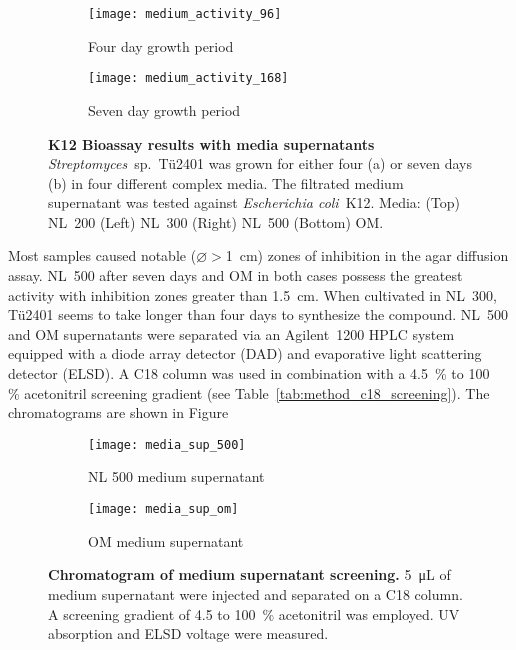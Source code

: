 \begin{figure}[htbp]
	\centering
	\begin{subfigure}{0.4\textwidth}
		\texttt{[image: medium\_activity\_96]}
		\caption{Four day growth period}
	\end{subfigure}%
	\begin{subfigure}{0.4\textwidth}
		\texttt{[image: medium\_activity\_168]}
		\caption{Seven day growth period}
	\end{subfigure}
	\caption[K12 Bioassay results with media supernatants]{%
		\textbf{K12 Bioassay results with media supernatants} \textit{Streptomyces}~sp.~Tü2401 was grown for either four (a)
    or seven days (b) in four different complex media. The filtrated medium supernatant was tested against
    \textit{Escherichia coli}~K12. Media: (Top) NL~200 (Left) NL~300 (Right) NL~500 (Bottom) OM.}
	\label{fig:medium_activity}
\end{figure}

Most samples caused notable ($\varnothing>$\SI{1}{\centi\meter}) zones of inhibition in the agar diffusion assay.
NL~500 after seven days and OM in both cases possess the greatest activity with inhibition zones greater than \SI{1.5}{\centi\meter}.
When cultivated in NL~300, Tü2401 seems to take longer than four days to synthesize the
compound.
NL~500 and OM supernatants were separated via an Agilent~1200 HPLC system equipped with a diode array detector (DAD) and evaporative light scattering detector (ELSD).
A C18 column was used in combination with a 4.5~\% to 100~ \% acetonitril screening gradient (see Table~\ref{tab:method_c18_screening}). The chromatograms are shown in Figure 

\begin{figure}[htbp]
	\centering
	\begin{subfigure}{0.8\textwidth}
		\texttt{[image: media\_sup\_500]}
		\caption{NL 500 medium supernatant}
	\end{subfigure}
	\begin{subfigure}{0.8\textwidth}
		\texttt{[image: media\_sup\_om]}
		\caption{OM medium supernatant}
	\end{subfigure}
	\caption[Chromatogram of medium supernatant screening]{%
		\textbf{Chromatogram of medium supernatant screening.} \SI{5}{\micro\liter} of medium supernatant were injected and separated on a C18 column.
		A screening gradient of 4.5 to 100~\% acetonitril was employed. 
		UV absorption and ELSD voltage were measured.
	}
	\label{fig:results_medium_screen}
\end{figure}

